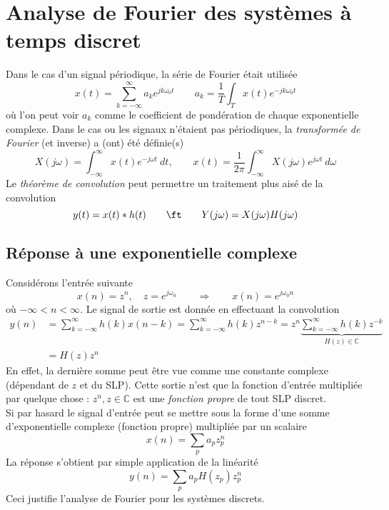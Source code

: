 \chapter{Analyse de Fourier des systèmes à temps discret}
Dans le cas d'un signal périodique, la série de Fourier était utilisée
\begin{equation}
x(t) = \sum_{k=-\infty}^\infty a_ke^{jk\omega_0t}\qquad a_k = \frac{1}{T}\int_T
x(t)e^{-jk\omega_0t}
\end{equation}
où l'on peut voir $a_k$ comme le coefficient de pondération de chaque exponentielle 
complexe. Dans le cas ou les signaux n'étaient pas périodiques, la \textit{transformée 
de Fourier} (et inverse) a (ont) été définie(s)
\begin{equation}
X(j\omega) = \int_{-\infty}^\infty x(t)e^{-j\omega t}\ dt,\qquad x(t)=\frac{1}{2\pi}
\int_{-\infty}^\infty X(j\omega)e^{j\omega t}\ d\omega
\end{equation}
Le \textit{théorème de convolution} peut permettre un traitement plus aisé de la 
convolution
\begin{equation}
y(t) = x(t)*h(t)\qquad \ft\qquad Y(j\omega) = X(j\omega)H(j\omega)
\end{equation}

\section{Réponse à une exponentielle complexe}
Considérons l'entrée suivante
\begin{equation}
x(n) = z^n,\quad z=e^{j\omega_0}\qquad\Rightarrow\qquad x(n) = e^{j\omega_0n}
\end{equation}
où $-\infty<n<\infty$. Le signal de sortie est donnée en effectuant la convolution
\begin{equation}
\begin{array}{ll}
y(n) &= \sum_{k=-\infty}^\infty h(k)x(n-k) = \sum_{k=-\infty}^\infty h(k)z^{n-k} = z^n 
\underbrace{\sum_{k=-\infty}^\infty h(k)z^{-k}}_{H(z) \in \mathbb{C}}\\
&= H(z)z^n
\end{array}
\end{equation}
En effet, la dernière somme peut être vue comme une constante complexe (dépendant de $z$ 
et du SLP). Cette sortie  n'est que la fonction d'entrée multipliée par quelque chose : 
$z^n,z\in\mathbb{C}$ est une \textit{fonction propre} de tout SLP discret.\\
Si par hasard le signal d'entrée peut se mettre sous la forme d'une somme d'exponentielle 
complexe (fonction propre) multipliée par un scalaire
\begin{equation}
x(n) = \sum_p a_pz_p^n
\end{equation}
La réponse s'obtient par simple application de la linéarité
\begin{equation}
y(n) = \sum_p a_pH(z_p)z_p^n
\end{equation}
Ceci justifie l'analyse de Fourier pour les systèmes discrets.

